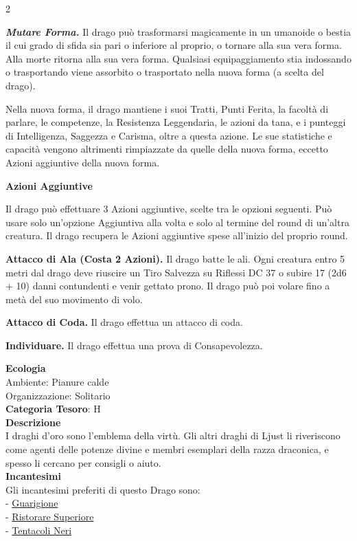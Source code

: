 \begin{multicols}{2}
{\emph{\textbf{Mutare Forma.}} Il drago può trasformarsi magicamente in un umanoide o bestia il cui grado di sfida sia pari o inferiore al proprio, o tornare alla sua vera forma. Alla morte ritorna alla sua vera forma. Qualsiasi equipaggiamento stia indossando o trasportando viene assorbito o trasportato nella nuova forma (a scelta del drago).

Nella nuova forma, il drago mantiene i suoi Tratti, Punti Ferita, la facoltà di parlare, le competenze, la Resistenza Leggendaria, le azioni da tana, e i punteggi di Intelligenza, Saggezza e Carisma, oltre a questa azione. Le sue statistiche e capacità vengono altrimenti rimpiazzate da quelle della nuova forma, eccetto Azioni aggiuntive della nuova forma.

\textbf{Azioni Aggiuntive}

Il drago può effettuare 3 Azioni aggiuntive, scelte tra le opzioni seguenti. Può usare solo un'opzione Aggiuntiva alla volta e solo al termine del round di un'altra creatura. Il drago recupera le Azioni aggiuntive spese all'inizio del proprio round.

\textbf{Attacco di Ala (Costa 2 Azioni).} Il drago batte le ali. Ogni creatura entro 5 metri dal drago deve riuscire un Tiro Salvezza su Riflessi DC 37 o subire 17 (2d6 + 10) danni contundenti e venir gettato prono. Il drago può poi volare fino a metà del suo movimento di volo.

\textbf{Attacco di Coda.} Il drago effettua un attacco di coda.

\textbf{Individuare.} Il drago effettua una prova di Consapevolezza.

\textbf{Ecologia}\\
Ambiente: Pianure calde\\
Organizzazione: Solitario\\
\textbf{Categoria Tesoro}: H\\
\textbf{Descrizione}\\
I draghi d'oro sono l'emblema della virtù. Gli altri draghi di Ljust li riveriscono come agenti delle potenze divine e membri esemplari della razza draconica, e spesso li cercano per consigli o aiuto.\\
\textbf{Incantesimi}\\
Gli incantesimi preferiti di questo Drago sono:\\
- \hyperlink{Guarigione}{Guarigione}\\
- \hyperlink{Ristorare Superiore}{Ristorare Superiore}\\
- \hyperlink{Tentacoli Neri}{Tentacoli Neri}

}
\end{multicols}
